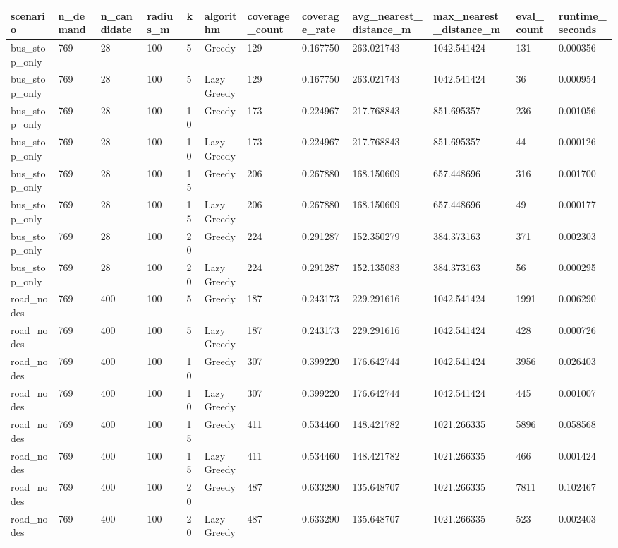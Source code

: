 \begin{tabular}{llllllllllll}
\hline
scenario & n_demand & n_candidate & radius_m & k & algorithm & coverage_count & coverage_rate & avg_nearest_distance_m & max_nearest_distance_m & eval_count & runtime_seconds \\
\hline
bus_stop_only & 769 & 28 & 100 & 5 & Greedy & 129 & 0.167750 & 263.021743 & 1042.541424 & 131 & 0.000356 \\
bus_stop_only & 769 & 28 & 100 & 5 & Lazy Greedy & 129 & 0.167750 & 263.021743 & 1042.541424 & 36 & 0.000954 \\
bus_stop_only & 769 & 28 & 100 & 10 & Greedy & 173 & 0.224967 & 217.768843 & 851.695357 & 236 & 0.001056 \\
bus_stop_only & 769 & 28 & 100 & 10 & Lazy Greedy & 173 & 0.224967 & 217.768843 & 851.695357 & 44 & 0.000126 \\
bus_stop_only & 769 & 28 & 100 & 15 & Greedy & 206 & 0.267880 & 168.150609 & 657.448696 & 316 & 0.001700 \\
bus_stop_only & 769 & 28 & 100 & 15 & Lazy Greedy & 206 & 0.267880 & 168.150609 & 657.448696 & 49 & 0.000177 \\
bus_stop_only & 769 & 28 & 100 & 20 & Greedy & 224 & 0.291287 & 152.350279 & 384.373163 & 371 & 0.002303 \\
bus_stop_only & 769 & 28 & 100 & 20 & Lazy Greedy & 224 & 0.291287 & 152.135083 & 384.373163 & 56 & 0.000295 \\
road_nodes & 769 & 400 & 100 & 5 & Greedy & 187 & 0.243173 & 229.291616 & 1042.541424 & 1991 & 0.006290 \\
road_nodes & 769 & 400 & 100 & 5 & Lazy Greedy & 187 & 0.243173 & 229.291616 & 1042.541424 & 428 & 0.000726 \\
road_nodes & 769 & 400 & 100 & 10 & Greedy & 307 & 0.399220 & 176.642744 & 1042.541424 & 3956 & 0.026403 \\
road_nodes & 769 & 400 & 100 & 10 & Lazy Greedy & 307 & 0.399220 & 176.642744 & 1042.541424 & 445 & 0.001007 \\
road_nodes & 769 & 400 & 100 & 15 & Greedy & 411 & 0.534460 & 148.421782 & 1021.266335 & 5896 & 0.058568 \\
road_nodes & 769 & 400 & 100 & 15 & Lazy Greedy & 411 & 0.534460 & 148.421782 & 1021.266335 & 466 & 0.001424 \\
road_nodes & 769 & 400 & 100 & 20 & Greedy & 487 & 0.633290 & 135.648707 & 1021.266335 & 7811 & 0.102467 \\
road_nodes & 769 & 400 & 100 & 20 & Lazy Greedy & 487 & 0.633290 & 135.648707 & 1021.266335 & 523 & 0.002403 \\
\hline
\end{tabular}
